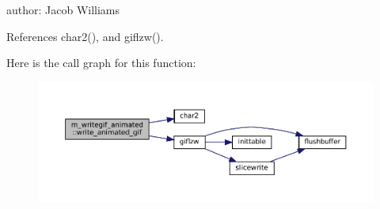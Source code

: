 author\+: Jacob Williams 



References char2(), and giflzw().

Here is the call graph for this function\+:
\nopagebreak
\begin{figure}[H]
\begin{center}
\leavevmode
\includegraphics[width=350pt]{namespacem__writegif__animated_a3da6a5c71a9d9e1f49aa075adc6629bd_cgraph}
\end{center}
\end{figure}
